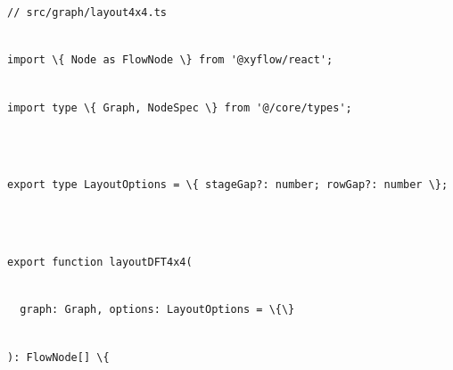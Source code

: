 \documentclass[
]{article}
\newcommand{\passthrough}[1]{#1}
\begin{document}
\passthrough{\lstinline!//!}\passthrough{\lstinline! !}\passthrough{\lstinline!src!}\passthrough{\lstinline!/graph/layout4x4.ts!}\strut \\
\passthrough{\lstinline!import!}\passthrough{\lstinline! !}\passthrough{\lstinline!\{!}\passthrough{\lstinline! !}\passthrough{\lstinline!Node!}\passthrough{\lstinline! !}\passthrough{\lstinline!as!}\passthrough{\lstinline! !}\passthrough{\lstinline!FlowNode!}\passthrough{\lstinline! !}\passthrough{\lstinline!\}!}\passthrough{\lstinline! !}\passthrough{\lstinline!from!}\passthrough{\lstinline! !}\passthrough{\lstinline!'@!}\passthrough{\lstinline!xyflow!}\passthrough{\lstinline!/react';!}\strut \\
\passthrough{\lstinline!import!}\passthrough{\lstinline! !}\passthrough{\lstinline!type!}\passthrough{\lstinline! !}\passthrough{\lstinline!\{!}\passthrough{\lstinline! !}\passthrough{\lstinline!Graph,!}\passthrough{\lstinline! !}\passthrough{\lstinline!NodeSpec!}\passthrough{\lstinline! !}\passthrough{\lstinline!\}!}\passthrough{\lstinline! !}\passthrough{\lstinline!from!}\passthrough{\lstinline! !}\passthrough{\lstinline!'@/core/types';!}\strut \\
\strut \\
\passthrough{\lstinline!export!}\passthrough{\lstinline! !}\passthrough{\lstinline!type!}\passthrough{\lstinline! !}\passthrough{\lstinline!LayoutOptions!}\passthrough{\lstinline! !}\passthrough{\lstinline!=!}\passthrough{\lstinline! !}\passthrough{\lstinline!\{!}\passthrough{\lstinline! !}\passthrough{\lstinline!stageGap!}\passthrough{\lstinline!?:!}\passthrough{\lstinline! !}\passthrough{\lstinline!number;!}\passthrough{\lstinline! !}\passthrough{\lstinline!rowGap!}\passthrough{\lstinline!?:!}\passthrough{\lstinline! !}\passthrough{\lstinline!number!}\passthrough{\lstinline! !}\passthrough{\lstinline!\};!}\strut \\
\strut \\
\passthrough{\lstinline!export!}\passthrough{\lstinline! !}\passthrough{\lstinline!function!}\passthrough{\lstinline! !}\passthrough{\lstinline!layoutDFT4x4(!}\strut \\
\passthrough{\lstinline!  !}\passthrough{\lstinline!graph:!}\passthrough{\lstinline! !}\passthrough{\lstinline!Graph,!}\passthrough{\lstinline! !}\passthrough{\lstinline!options:!}\passthrough{\lstinline! !}\passthrough{\lstinline!LayoutOptions!}\passthrough{\lstinline! !}\passthrough{\lstinline!=!}\passthrough{\lstinline! !}\passthrough{\lstinline!\{\}!}\strut \\
\passthrough{\lstinline!):!}\passthrough{\lstinline! !}\passthrough{\lstinline!FlowNode!}\passthrough{\lstinline![]!}\passthrough{\lstinline! !}\passthrough{\lstinline!\{!}\strut \\
\end{document}
